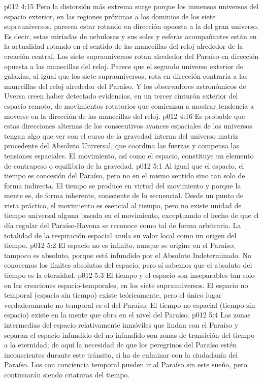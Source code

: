 \vs p012 4:15 Pero la distorsión más extrema surge porque los inmensos universos del espacio exterior, en las regiones próximas a los dominios de los siete suprauniversos, parecen estar rotando en dirección opuesta a la del gran universo. Es decir, estas miríadas de nebulosas y sus soles y esferas acompañantes están en la actualidad rotando en el sentido de las manecillas del reloj alrededor de la creación central. Los siete suprauniversos rotan alrededor del Paraíso en dirección opuesta a las manecillas del reloj. Parece que el segundo universo exterior de galaxias, al igual que los siete suprauniversos, rota en dirección contraria a las manecillas del reloj alrededor del Paraíso. Y los observadores astronómicos de Uversa creen haber detectado evidencias, en un tercer cinturón exterior del espacio remoto, de movimientos rotatorios que comienzan a mostrar tendencia a moverse en la dirección de las manecillas del reloj.
\vs p012 4:16 Es probable que estas direcciones alternas de los consecutivos avances espaciales de los universos tengan algo que ver con el curso de la gravedad interna del universo matriz procedente del Absoluto Universal, que coordina las fuerzas y compensa las tensiones espaciales. El movimiento, así como el espacio, constituye un elemento de contrapeso o equilibrio de la gravedad.
\vs p012 5:1 Al igual que el espacio, el tiempo es concesión del Paraíso, pero no en el mismo sentido sino tan solo de forma indirecta. El tiempo se produce en virtud del movimiento y porque la mente es, de forma inherente, consciente de lo secuencial. Desde un punto de vista práctico, el movimiento es esencial al tiempo, pero no existe unidad de tiempo universal alguna basada en el movimiento, exceptuando el hecho de que el día regular del Paraíso\hyp{}Havona se reconoce como tal de forma arbitraria. La totalidad de la respiración espacial anula su valor local como un origen del tiempo.
\vs p012 5:2 El espacio no es infinito, aunque se origine en el Paraíso; tampoco es absoluto, porque está infundido por el Absoluto Indeterminado. No conocemos los límites absolutos del espacio, pero sí sabemos que el absoluto del tiempo es la eternidad.
\vs p012 5:3 \pc El tiempo y el espacio son inseparables tan solo en las creaciones espacio\hyp{}temporales, en los siete suprauniversos. El espacio no temporal (espacio sin tiempo) existe teóricamente, pero el único lugar verdaderamente no temporal es el  del Paraíso. El tiempo no espacial (tiempo sin espacio) existe en la mente que obra en el nivel del Paraíso.
\vs p012 5:4 Las zonas intermedias del espacio relativamente inmóviles que lindan con el Paraíso y separan el espacio infundido del no infundido son zonas de transición del tiempo a la eternidad; de aquí la necesidad de que los peregrinos del Paraíso estén inconscientes durante este tránsito, si ha de culminar con la ciudadanía del Paraíso. Los  con conciencia temporal pueden ir al Paraíso sin este sueño, pero continuarán siendo criaturas del tiempo.
